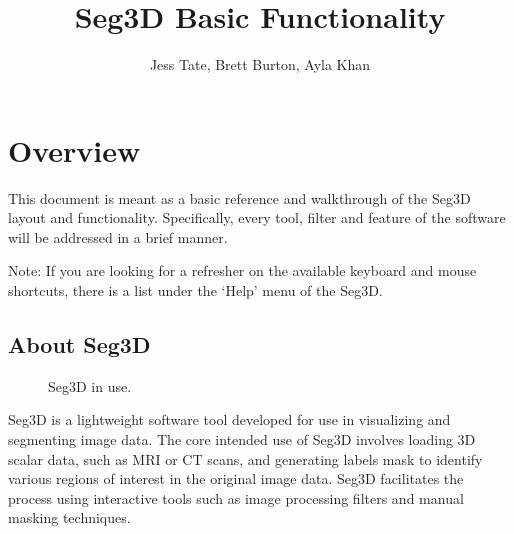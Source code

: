 \documentclass[fleqn,11pt,openany]{book}
\title{Seg3D Basic Functionality}
\author{Jess Tate, Brett Burton, Ayla Khan}
\begin{document}
\maketitle


\chapter{Overview}
\label{sec:overview}

\begin{introduction}
This document is meant as a basic reference and walkthrough of the Seg3D layout and functionality.  Specifically, every tool, filter and feature of the software will be addressed in a brief manner.

Note:  If you are looking for a refresher on the available keyboard and mouse shortcuts, there is a list under the `Help' menu of the Seg3D.  
\end{introduction}

\section{About Seg3D}

\begin{figure}
\caption{Seg3D in use.}\label{fig:layout}
\end{figure}

Seg3D is a lightweight software tool developed for use in visualizing and segmenting image data.  The core intended use of Seg3D involves loading 3D scalar data, such as MRI or CT scans, and generating labels mask to identify various regions of interest in the original image data.  Seg3D facilitates the process using interactive tools such as image processing filters and manual masking techniques.  
\end{document}
